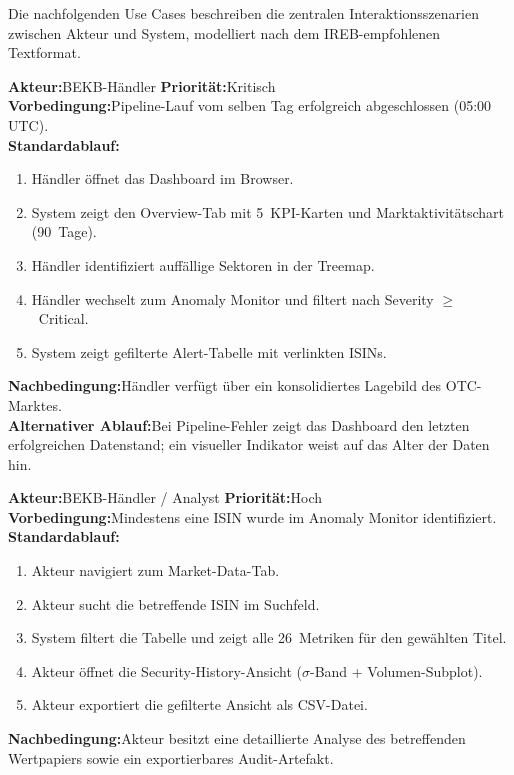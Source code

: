 \documentclass[11pt, a4paper, oneside, openany]{report}
\begin{document}
Die nachfolgenden Use Cases beschreiben die zentralen Interaktionsszenarien zwischen Akteur und System, modelliert nach dem IREB-empfohlenen Textformat.

\begin{reqbox}
\textbf{Akteur:}\;BEKB-Händler \qquad \textbf{Priorität:}\;Kritisch \\[4pt]
\textbf{Vorbedingung:}\;Pipeline-Lauf vom selben Tag erfolgreich abgeschlossen (05:00\,UTC). \\[4pt]
\textbf{Standardablauf:}
\begin{enumerate}[leftmargin=2em]
  \item Händler öffnet das Dashboard im Browser.
  \item System zeigt den Overview-Tab mit 5~KPI-Karten und Marktaktivitätschart (90~Tage).
  \item Händler identifiziert auffällige Sektoren in der Treemap.
  \item Händler wechselt zum Anomaly Monitor und filtert nach Severity $\geq$~Critical.
  \item System zeigt gefilterte Alert-Tabelle mit verlinkten ISINs.
\end{enumerate}
\textbf{Nachbedingung:}\;Händler verfügt über ein konsolidiertes Lagebild des OTC-Marktes. \\[4pt]
\textbf{Alternativer Ablauf:}\;Bei Pipeline-Fehler zeigt das Dashboard den letzten erfolgreichen Datenstand; ein visueller Indikator weist auf das Alter der Daten hin.
\end{reqbox}

\vspace{8pt}

\begin{reqbox}
\textbf{Akteur:}\;BEKB-Händler / Analyst \qquad \textbf{Priorität:}\;Hoch \\[4pt]
\textbf{Vorbedingung:}\;Mindestens eine ISIN wurde im Anomaly Monitor identifiziert. \\[4pt]
\textbf{Standardablauf:}
\begin{enumerate}[leftmargin=2em]
  \item Akteur navigiert zum Market-Data-Tab.
  \item Akteur sucht die betreffende ISIN im Suchfeld.
  \item System filtert die Tabelle und zeigt alle 26~Metriken für den gewählten Titel.
  \item Akteur öffnet die Security-History-Ansicht ($\sigma$-Band + Volumen-Subplot).
  \item Akteur exportiert die gefilterte Ansicht als CSV-Datei.
\end{enumerate}
\textbf{Nachbedingung:}\;Akteur besitzt eine detaillierte Analyse des betreffenden Wertpapiers sowie ein exportierbares Audit-Artefakt.
\end{reqbox}
\end{document}
